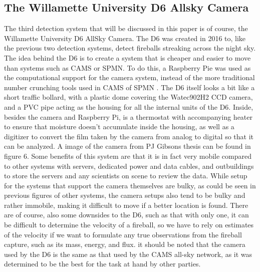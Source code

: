 \subsection{The Willamette University D6 Allsky Camera}

The third detection system that will be discussed in this paper is of course, the Willamette University D6 AllSky Camera. 
The D6 was created in 2016 to, like the previous two detection systems, detect fireballs streaking across the night sky.
The idea behind the D6 is to create a system that is cheaper and easier to move than systems such as CAMS or SPMN. 
To do this, a Raspberry Pie was used as the computational support for the camera system, instead of the more traditional number crunching tools used in CAMS of SPMN \cite{McSwain}.
The D6 itself looks a bit like a short traffic bollard, with a plastic dome covering the Watec902H2 CCD camera, and a PVC pipe acting as the housing for all the internal units of the D6.
Inside, besides the camera and Raspberry Pi, is a thermostat with accompanying heater to ensure that moisture doesn't accumulate inside the housing, as well as a digitizer to convert the film taken by the camera from analog to digital so that it can be analyzed. A image of the camera from PJ Gibsons thesis can be found in figure 6.
Some benefits of this system are that it is in fact very mobile compared to other systems with servers, dedicated power and data cables, and outbuildings to store the servers and any scientists on scene to review the data.
While setup for the systems that support the camera themselves are bulky, as could be seen in previous figures of other systems, the camera setups also tend to be bulky and rather immobile, making it difficult to move if a better location is found.
There are of course, also some downsides to the D6, such as that with only one, it can be difficult to determine the velocity of a fireball, so we have to rely on estimates of the velocity if we want to formulate any true observations from the fireball capture, such as its mass, energy, and flux.
it should be noted that the camera used by the D6 is the same as that used by the CAMS all-sky network, as it was determined to be the best for the task at hand by other parties\cite{jenniskens}.

